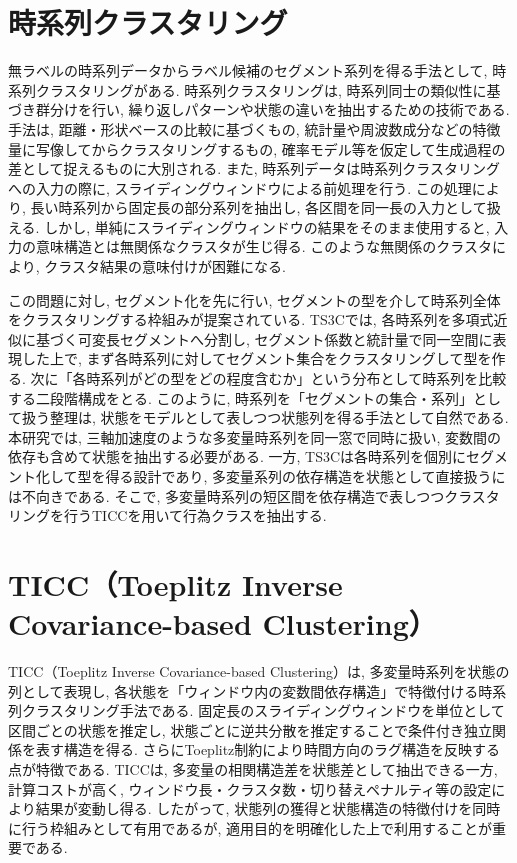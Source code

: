 \documentclass[a4paper,12pt]{jreport}
\begin{document}
\section{時系列クラスタリング}
無ラベルの時系列データからラベル候補のセグメント系列を得る手法として, 時系列クラスタリングがある. 時系列クラスタリングは, 時系列同士の類似性に基づき群分けを行い, 繰り返しパターンや状態の違いを抽出するための技術である. 手法は, 距離・形状ベースの比較に基づくもの, 統計量や周波数成分などの特徴量に写像してからクラスタリングするもの, 確率モデル等を仮定して生成過程の差として捉えるものに大別される. また, 時系列データは時系列クラスタリングへの入力の際に, スライディングウィンドウによる前処理を行う. この処理により, 長い時系列から固定長の部分系列を抽出し, 各区間を同一長の入力として扱える. しかし, 単純にスライディングウィンドウの結果をそのまま使用すると, 入力の意味構造とは無関係なクラスタが生じ得る. このような無関係のクラスタにより, クラスタ結果の意味付けが困難になる.

この問題に対し, セグメント化を先に行い, セグメントの型を介して時系列全体をクラスタリングする枠組みが提案されている. TS3Cでは, 各時系列を多項式近似に基づく可変長セグメントへ分割し, セグメント係数と統計量で同一空間に表現した上で, まず各時系列に対してセグメント集合をクラスタリングして型を作る. 次に「各時系列がどの型をどの程度含むか」という分布として時系列を比較する二段階構成をとる. このように, 時系列を「セグメントの集合・系列」として扱う整理は, 状態をモデルとして表しつつ状態列を得る手法として自然である. 本研究では, 三軸加速度のような多変量時系列を同一窓で同時に扱い, 変数間の依存も含めて状態を抽出する必要がある. 一方, TS3Cは各時系列を個別にセグメント化して型を得る設計であり, 多変量系列の依存構造を状態として直接扱うには不向きである. そこで, 多変量時系列の短区間を依存構造で表しつつクラスタリングを行うTICCを用いて行為クラスを抽出する.

\section{TICC（Toeplitz Inverse Covariance-based Clustering）}
TICC（Toeplitz Inverse Covariance-based Clustering）は, 多変量時系列を状態の列として表現し, 各状態を「ウィンドウ内の変数間依存構造」で特徴付ける時系列クラスタリング手法である. 固定長のスライディングウィンドウを単位として区間ごとの状態を推定し, 状態ごとに逆共分散を推定することで条件付き独立関係を表す構造を得る. さらにToeplitz制約により時間方向のラグ構造を反映する点が特徴である. TICCは, 多変量の相関構造差を状態差として抽出できる一方, 計算コストが高く, ウィンドウ長・クラスタ数・切り替えペナルティ等の設定により結果が変動し得る. したがって, 状態列の獲得と状態構造の特徴付けを同時に行う枠組みとして有用であるが, 適用目的を明確化した上で利用することが重要である.
\end{document}
